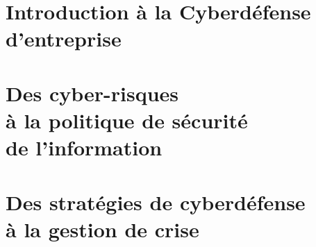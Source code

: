

\part[Cyber-généralités]{Introduction à la Cyberdéfense d'entreprise}




\part[Risques et Mesures de sécurité]{Des cyber-risques \\à la politique de sécurité \\de l'information}





\part[Sécurité opérationnelle]{Des stratégies de cyberdéfense \\à la gestion de crise}


